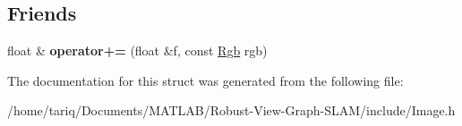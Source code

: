 \subsection*{Friends}
\begin{DoxyCompactItemize}
\item 
float \& {\bfseries operator+=} (float \&f, const \hyperlink{structImage_1_1Rgb}{Rgb} rgb)\hypertarget{structImage_1_1Rgb_a17d83fc3a2279cf422519ff20c2b953e}{}\label{structImage_1_1Rgb_a17d83fc3a2279cf422519ff20c2b953e}

\end{DoxyCompactItemize}


The documentation for this struct was generated from the following file\+:\begin{DoxyCompactItemize}
\item 
/home/tariq/\+Documents/\+M\+A\+T\+L\+A\+B/\+Robust-\/\+View-\/\+Graph-\/\+S\+L\+A\+M/include/Image.\+h\end{DoxyCompactItemize}
